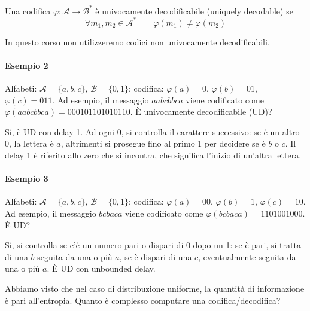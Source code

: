 \begin{definition}
    Una codifica $\varphi:\mathcal{A}\to\mathcal{B}^*$ è univocamente decodificabile (uniquely decodable) se
    $$
        \forall m_1,m_2\in\mathcal{A}^* \qquad \varphi(m_1)\neq\varphi(m_2)
    $$
\end{definition}
In questo corso non utilizzeremo codici non univocamente decodificabili.

\paragraph{Esempio 2} Alfabeti: $\mathcal{A}=\{a,b,c\}$, $\mathcal{B}=\{0,1\}$; codifica: $\varphi(a)=0$, $\varphi(b)=01$, $\varphi(c)=011$. Ad esempio, il messaggio $aabcbbca$ viene codificato come $\varphi(aabcbbca)=000101101010110$. È univocamente decodificabile (UD)?

Sì, è UD con delay 1. Ad ogni 0, si controlla il carattere successivo: se è un altro 0, la lettera è $a$, altrimenti si prosegue fino al primo 1 per decidere se è $b$ o $c$. Il delay 1 è riferito allo zero che si incontra, che significa l'inizio di un'altra lettera.

\paragraph{Esempio 3} Alfabeti: $\mathcal{A}=\{a,b,c\}$, $\mathcal{B}=\{0,1\}$; codifica: $\varphi(a)=00$, $\varphi(b)=1$, $\varphi(c)=10$. Ad esempio, il messaggio $bcbaca$ viene codificato come $\varphi(bcbaca)=1101001000$. È UD? 

Sì, si controlla se c'è un numero pari o dispari di 0 dopo un 1: se è pari, si tratta di una $b$ seguita da una o più $a$, se è dispari di una $c$, eventualmente seguita da una o più $a$. È UD con unbounded delay.\bigskip 

Abbiamo visto che nel caso di distribuzione uniforme, la quantità di informazione è pari all'entropia. Quanto è complesso computare una codifica/decodifica?

